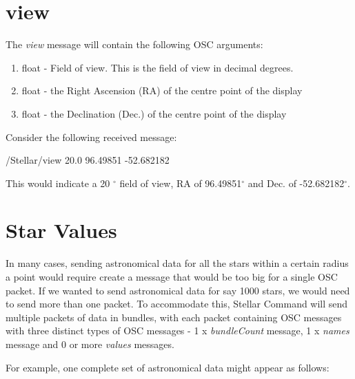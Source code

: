 \section{view}
The \textit{view} message will contain the following OSC arguments:
\begin{enumerate}
	\item float - Field of view. This is the field of view in decimal degrees. 
	\item float - the Right Ascension (RA) of the centre point of the display
	\item float - the Declination (Dec.) of the centre point of the display
\end{enumerate}
Consider the following received message:
\begin{syntax}
	/Stellar/view 20.0 96.49851 -52.682182  \\
\end{syntax}
\bigskip
This would indicate a 20 $^{\circ}$ field of view, RA of 96.49851$^{\circ}$ and Dec. of -52.682182$^{\circ}$.

\section{Star Values} \label{sec:starvalues} 
In many cases, sending astronomical data for all the stars within a certain radius a point would require create a message that would be too big for a single OSC packet. If we wanted to send astronomical data for say 1000 stars, we would need to send more than one packet. To accommodate this, Stellar Command will send multiple packets of data in bundles, with each packet containing OSC messages with  three distinct types of OSC messages - 1 x \textit{bundleCount} message, 1 x \textit{names} message and 0 or more \textit{values} messages. 

For example, one complete set of astronomical data might appear as follows:

